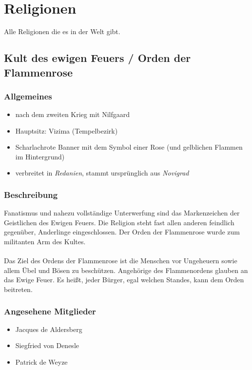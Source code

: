 {\let\clearpage\relax\chapter{Religionen}}
Alle Religionen die es in der Welt gibt.

\section{Kult des ewigen Feuers / Orden der Flammenrose}
\subsection{Allgemeines}
\begin{itemize}
\item nach dem zweiten Krieg mit Nilfgaard
\item Hauptsitz: Vizima (Tempelbezirk)
\item Scharlachrote Banner mit dem Symbol einer Rose (und gelblichen Flammen im Hintergrund)
\item verbreitet in \textit{Redanien}, stammt ursprünglich aus \textit{Novigrad}
\end{itemize}

\subsection{Beschreibung}
Fanatismus und nahezu vollständige Unterwerfung sind das Markenzeichen der Geistlichen des Ewigen Feuers. 
Die Religion steht fast allen anderen feindlich gegenüber, Anderlinge eingeschlossen. 
Der Orden der Flammenrose wurde zum militanten Arm des Kultes.\\
~\\
Das Ziel des Ordens der Flammenrose ist die Menschen vor Ungeheuern sowie allem Übel und Bösen zu beschützen. 
Angehörige des Flammenordens glauben an das Ewige Feuer. Es heißt, jeder Bürger, egal welchen Standes, kann dem 
Orden beitreten. 

\subsection{Angesehene Mitglieder}
\begin{itemize}
\item Jacques de Aldersberg
\item Siegfried von Denesle
\item Patrick de Weyze 
\end{itemize}

